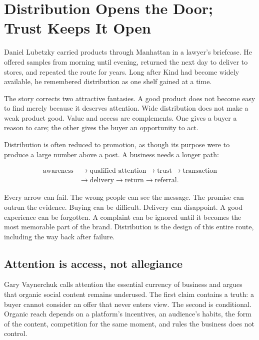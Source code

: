 \chapter{Distribution Opens the Door; Trust Keeps It Open}

Daniel Lubetzky carried products through Manhattan in a lawyer's briefcase. He
offered samples from morning until evening, returned the next day to deliver to
stores, and repeated the route for years. Long after Kind had become widely
available, he remembered distribution as one shelf gained at a time.

The story corrects two attractive fantasies. A good product does not become
easy to find merely because it deserves attention. Wide distribution does not
make a weak product good. Value and access are complements. One gives a buyer a
reason to care; the other gives the buyer an opportunity to act.

Distribution is often reduced to promotion, as though its purpose were to
produce a large number above a post. A business needs a longer path:

\begin{equation}
\begin{aligned}
\text{awareness}&\longrightarrow\text{qualified attention}
\longrightarrow\text{trust}\longrightarrow\text{transaction}\\
&\longrightarrow\text{delivery}\longrightarrow\text{return}
\longrightarrow\text{referral}.
\end{aligned}
\end{equation}

Every arrow can fail. The wrong people can see the message. The promise can
outrun the evidence. Buying can be difficult. Delivery can disappoint. A good
experience can be forgotten. A complaint can be ignored until it becomes the
most memorable part of the brand. Distribution is the design of this entire
route, including the way back after failure.

\section{Attention is access, not allegiance}

Gary Vaynerchuk calls attention the essential currency of business and argues
that organic social content remains underused. The first claim contains a
truth: a buyer cannot consider an offer that never enters view. The second is
conditional. Organic reach depends on a platform's incentives, an audience's
habits, the form of the content, competition for the same moment, and rules the
business does not control.

